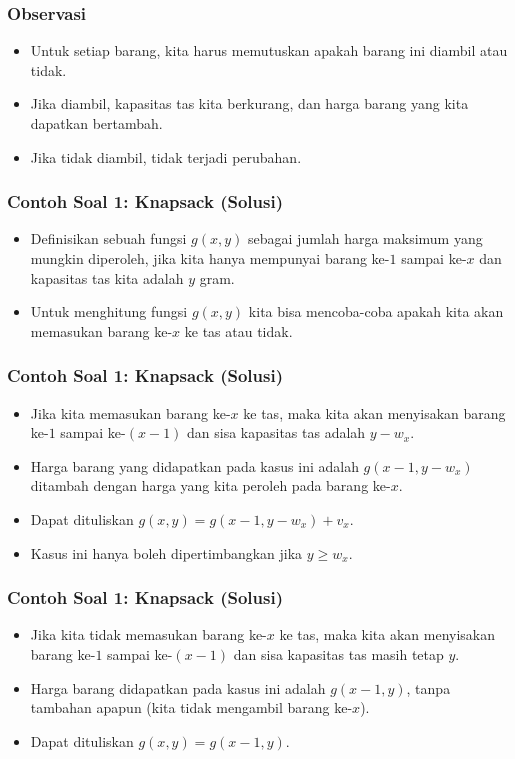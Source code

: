 \begin{frame} 
\frametitle{Observasi}
\begin{itemize}
  \item Untuk setiap barang, kita harus memutuskan apakah barang ini diambil atau tidak.
  \item Jika diambil, kapasitas tas kita berkurang, dan harga barang yang kita dapatkan bertambah.
  \item Jika tidak diambil, tidak terjadi perubahan.
\end{itemize}
\end{frame}

\begin{frame} 
\frametitle{Contoh Soal 1: Knapsack (Solusi)}
\begin{itemize}
  \item Definisikan sebuah fungsi $g(x,y)$ sebagai jumlah harga maksimum yang mungkin diperoleh, jika kita hanya mempunyai barang ke-$1$ sampai ke-$x$ dan kapasitas tas kita adalah $y$ gram.
  \item Untuk menghitung fungsi $g(x,y)$ kita bisa mencoba-coba apakah kita akan memasukan barang ke-$x$ ke tas atau tidak.
\end{itemize}
\end{frame}

\begin{frame} 
\frametitle{Contoh Soal 1: Knapsack (Solusi)}
\begin{itemize}
  \item Jika kita memasukan barang ke-$x$ ke tas, maka kita akan menyisakan barang ke-$1$ sampai ke-$(x-1)$ dan sisa kapasitas tas adalah $y-w_x$. 
  \item Harga barang yang didapatkan pada kasus ini adalah $g(x-1,y-w_x)$ ditambah dengan harga yang kita peroleh pada barang ke-$x$.
  \item Dapat dituliskan $g(x, y) = g(x-1, y-w_x) + v_x$.
  \item Kasus ini hanya boleh dipertimbangkan jika $y \geq w_x$.
\end{itemize}
\end{frame}

\begin{frame} 
\frametitle{Contoh Soal 1: Knapsack (Solusi)}
\begin{itemize}
  \item Jika kita tidak memasukan barang ke-$x$ ke tas, maka kita akan menyisakan barang ke-$1$ sampai ke-$(x-1)$ dan sisa kapasitas tas masih tetap $y$.
  \item Harga barang didapatkan pada kasus ini adalah $g(x-1,y)$, tanpa tambahan apapun (kita tidak mengambil barang ke-$x$).
  \item Dapat dituliskan $g(x, y) = g(x-1, y)$.
\end{itemize}
\end{frame}

